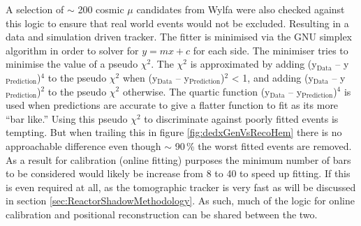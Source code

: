 A selection of $\sim$ 200 cosmic $\mu$ candidates from Wylfa were also checked against this logic to ensure that real world events would not be excluded. Resulting in a data and simulation driven tracker. The fitter is minimised via the GNU simplex algorithm \cite{galassi2002gnu} in order to solver for $y = mx + c$ for each side. The minimiser tries to minimise the value of a pseudo $\chi^2$. The $\chi^2$ is approximated by adding (y$_\textrm{{Data}}$ -- y$_\textrm{{Prediction}}$)$^4$ to the pseudo $\chi^2$ when (y$_\textrm{{Data}}$ -- y$_\textrm{{Prediction}}$)$^2$ < 1, and adding (y$_\textrm{{Data}}$ -- y$_\textrm{{Prediction}}$)$^2$ to the pseudo $\chi^2$ otherwise. The quartic function (y$_\textrm{{Data}}$ -- y$_\textrm{{Prediction}}$)$^4$ is used when predictions are accurate to give a flatter function to fit as its more ``bar like.'' Using this pseudo $\chi^2$ to discriminate against poorly fitted events is tempting. But when trailing this in figure \ref{fig:dedxGenVsRecoHem} there is no approachable difference even though $\sim$ 90\,\% the worst fitted events are removed. As a result for calibration (online fitting) purposes the minimum number of bars to be considered would likely be increase from 8 to 40 to speed up fitting. If this is even required at all, as the tomographic tracker is very fast as will be discussed in section \ref{sec:ReactorShadowMethodology}. As such, much of the logic for online calibration and positional reconstruction can be shared between the two. 

